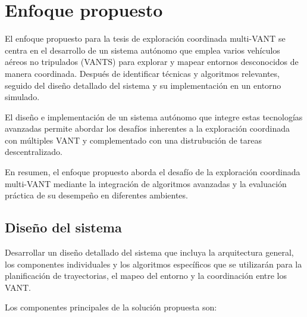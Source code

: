 \chapter{Enfoque propuesto}

El enfoque propuesto para la tesis de exploración coordinada multi-VANT se centra en el desarrollo de un sistema autónomo que emplea varios vehículos aéreos no tripulados (VANTS) para explorar y mapear entornos desconocidos de manera coordinada. Después de identificar técnicas y algoritmos relevantes, seguido del diseño detallado del sistema y su implementación en un entorno simulado.

El diseño e implementación de un sistema autónomo que integre estas tecnologías avanzadas permite abordar los desafíos inherentes a la exploración coordinada con múltiples VANT y complementado con una distrubución de tareas descentralizado.

En resumen, el enfoque propuesto aborda el desafío de la exploración coordinada multi-VANT mediante la integración de algoritmos avanzadas y la evaluación práctica de su desempeño en diferentes ambientes.





\section{Diseño del sistema}

Desarrollar un diseño detallado del sistema que incluya la arquitectura general, los componentes individuales y los algoritmos específicos que se utilizarán para la planificación de trayectorias, el mapeo del entorno y la coordinación entre los VANT.

Los componentes principales de la solución propuesta son:

